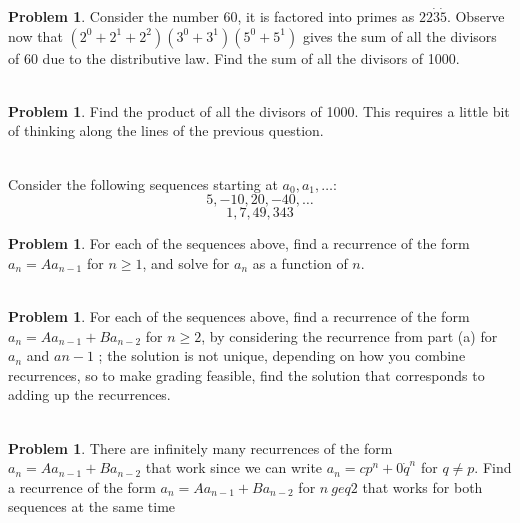 \documentclass[10pt,leqno ]{article}
\theoremstyle{definition}
\newtheorem{problem}[theorem]{Problem}
\begin{document}
\begin{problem} Consider the number 60, it is factored into primes as $22 \dot 3 \dot 5$.  Observe now that $(2^0+ 2^1+ 2^2)(3^0+ 3^1)(5^0+ 5^1)$ gives the sum of all the divisors of 60 due to the distributive law.  Find the sum of all the divisors of 1000.
\\\\
\Large
\end{problem}
\newpage

\begin{problem} Find the product of all the divisors of 1000.  This requires a little bit of thinking along the lines of the previous question.
\\\\
\Large
\end{problem}
\newpage

Consider the following sequences starting at $a_0, a_1, \dots$:
$$5, -10, 20, -40, \dots$$
$$ 1, 7, 49, 343$$
\begin{problem} For each of the sequences above, find a recurrence of the form $a_n = Aa_{n-1}$ for $n \geq 1$, and solve for $a_n$ as a function of $n$.
\\\\
\Large
\end{problem}
\newpage

\begin{problem} For each of the sequences above, find a recurrence of the form $a_n=Aa_{n-1} + Ba_{n-2}$ for $n \geq 2$, by considering the recurrence from part (a) for $a_n$ and $a{n-1}$ ; the solution is not unique,  depending on how you combine recurrences,  so to make grading feasible, find the solution that corresponds to adding up the recurrences.
\\\\
\Large
\end{problem}
\newpage

\begin{problem} There are infinitely many recurrences of the form $a_n=Aa_{n-1}+Ba_{n-2}$ that work since we can write $a_n=cp^n+ 0 \dot q^n$ for $q \neq p$.  Find a recurrence of the form $a_n=Aa_{n-1}+Ba_{n-2}$ for $n\ geq 2$ that works for both sequences at the same time
\\\\
\Large
\end{problem}
\newpage
\end{document}
